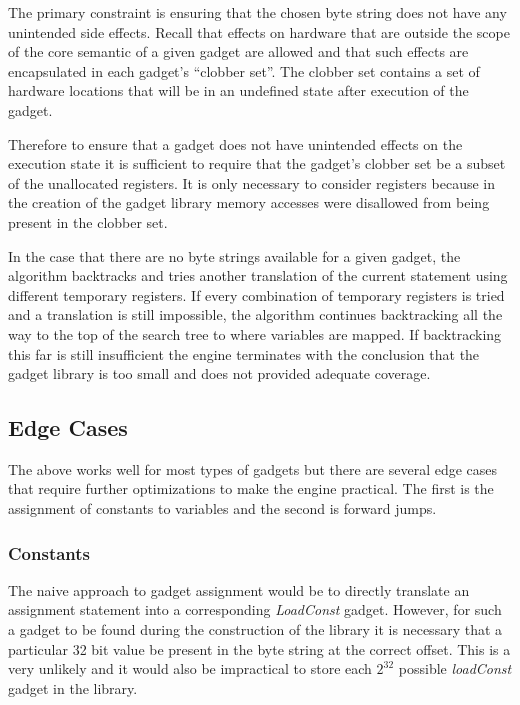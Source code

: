     The primary constraint is ensuring that the chosen byte string does not have
    any unintended side effects. Recall that effects on hardware that are
    outside the scope of the core semantic of a given gadget are allowed and
    that such effects are encapsulated in each gadget's ``clobber set''. The
    clobber set contains a set of hardware locations that will be in an
    undefined state after execution of the gadget.

    Therefore to ensure that a gadget does not have unintended effects on the
    execution state it is sufficient to require that the gadget's clobber set be
    a subset of the unallocated registers. It is only necessary to consider
    registers because in the creation of the gadget library memory accesses were
    disallowed from being present in the clobber set.

    In the case that there are no byte strings available for a given gadget, the
    algorithm backtracks and tries another translation of the current statement
    using different temporary registers. If every combination of temporary
    registers is tried and a translation is still impossible, the algorithm
    continues backtracking all the way to the top of the search tree to where
    variables are mapped. If backtracking this far is still insufficient the
    engine terminates with the conclusion that the gadget library is too small
    and does not provided adequate coverage. 

    \subsection{Edge Cases}

    The above works well for most types of gadgets but there are several edge
    cases that require further optimizations to make the engine practical.  The
    first is the assignment of constants to variables and the second is forward
    jumps.

    \subsubsection{Constants}

    The naive approach to gadget assignment would be to directly translate an
    assignment statement into a corresponding \emph{LoadConst} gadget. However,
    for such a gadget to be found during the construction of the library it is
    necessary that a particular 32 bit value be present in the byte string at
    the correct offset. This is a very unlikely and it would also be impractical
    to store each $2^{32}$ possible \emph{loadConst} gadget in the library. 

